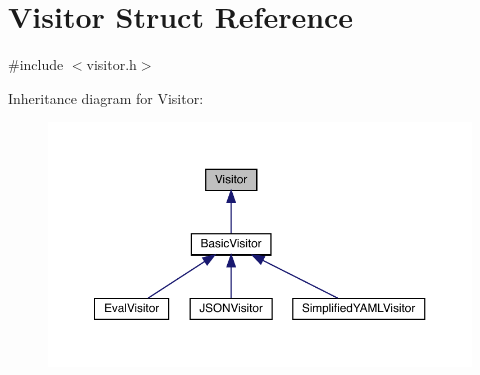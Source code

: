 \hypertarget{struct_visitor}{}\section{Visitor Struct Reference}
\label{struct_visitor}


{\ttfamily \#include $<$visitor.\+h$>$}



Inheritance diagram for Visitor\+:\nopagebreak
\begin{figure}[H]
\begin{center}
\leavevmode
\includegraphics[width=350pt]{struct_visitor__inherit__graph}
\end{center}
\end{figure}
